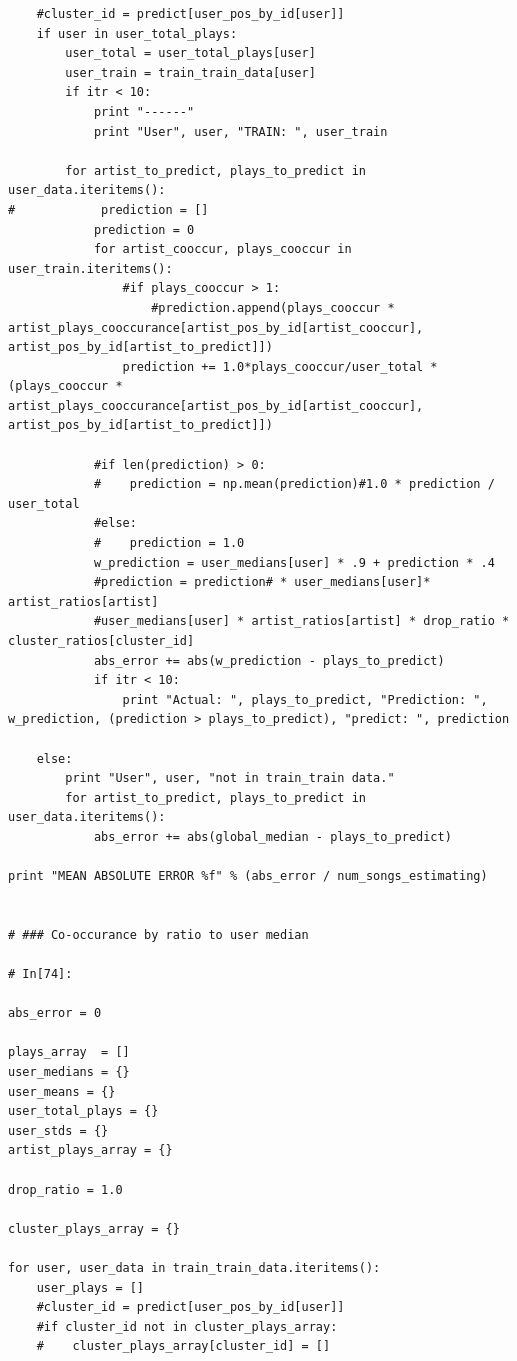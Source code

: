 \documentclass[11pt]{article}
\begin{document}
\begin{lstlisting}
    #cluster_id = predict[user_pos_by_id[user]]
    if user in user_total_plays:
        user_total = user_total_plays[user]
        user_train = train_train_data[user]
        if itr < 10:
            print "------"
            print "User", user, "TRAIN: ", user_train
    
        for artist_to_predict, plays_to_predict in user_data.iteritems():
#            prediction = []
            prediction = 0
            for artist_cooccur, plays_cooccur in user_train.iteritems():
                #if plays_cooccur > 1:
                    #prediction.append(plays_cooccur * artist_plays_cooccurance[artist_pos_by_id[artist_cooccur], artist_pos_by_id[artist_to_predict]])
                prediction += 1.0*plays_cooccur/user_total * (plays_cooccur * artist_plays_cooccurance[artist_pos_by_id[artist_cooccur], artist_pos_by_id[artist_to_predict]])
        
            #if len(prediction) > 0:
            #    prediction = np.mean(prediction)#1.0 * prediction / user_total
            #else:
            #    prediction = 1.0
            w_prediction = user_medians[user] * .9 + prediction * .4
            #prediction = prediction# * user_medians[user]* artist_ratios[artist]
            #user_medians[user] * artist_ratios[artist] * drop_ratio * cluster_ratios[cluster_id]
            abs_error += abs(w_prediction - plays_to_predict) 
            if itr < 10:
                print "Actual: ", plays_to_predict, "Prediction: ", w_prediction, (prediction > plays_to_predict), "predict: ", prediction

    else:
        print "User", user, "not in train_train data."
        for artist_to_predict, plays_to_predict in user_data.iteritems():
            abs_error += abs(global_median - plays_to_predict)
            
print "MEAN ABSOLUTE ERROR %f" % (abs_error / num_songs_estimating)


# ### Co-occurance by ratio to user median

# In[74]:

abs_error = 0

plays_array  = []
user_medians = {}
user_means = {}
user_total_plays = {}
user_stds = {}
artist_plays_array = {}

drop_ratio = 1.0

cluster_plays_array = {}

for user, user_data in train_train_data.iteritems():
    user_plays = []
    #cluster_id = predict[user_pos_by_id[user]]
    #if cluster_id not in cluster_plays_array:
    #    cluster_plays_array[cluster_id] = []
    

\end{lstlisting}
\end{document}
